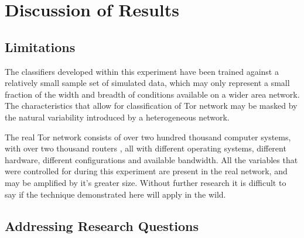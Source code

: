 \chapter{Discussion of Results}

\section{Limitations}

The classifiers developed within this experiment have been trained against
a relatively small sample set of simulated data, which may only represent
a small fraction of the width and breadth of conditions available on a wider
area network. The characteristics that allow for classification of Tor network
may be masked by the natural variability introduced by a heterogeneous network.

The real Tor network consists of over two hundred thousand computer systems,
with over two thousand routers \parencite{TorStatus:2011fk}, all with different
operating systems, different hardware, different configurations and available
bandwidth. All the variables that were controlled for during this experiment
are present in the real network, and may be amplified by it's greater size.
Without further research it is difficult to say if the technique demonstrated
here will apply in the wild.

\section{Addressing Research Questions}

